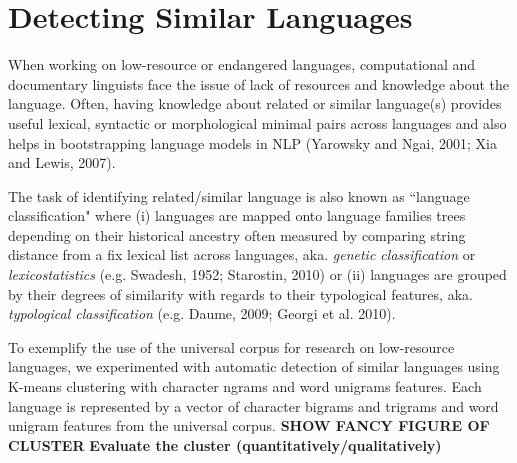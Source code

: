 \section{Detecting Similar Languages} \label{sec:cluster}

When working on low-resource or endangered languages, computational and documentary linguists face the issue of lack of resources and knowledge about the language. Often, having knowledge about related or similar language(s) provides useful lexical, syntactic or morphological minimal pairs across languages and also helps in bootstrapping language models in NLP (Yarowsky
and Ngai, 2001; Xia and Lewis, 2007). 

The task of identifying related/similar language is also known as ``language classification" where (i) languages are mapped onto language families trees depending on their historical ancestry often measured by comparing string distance from a fix lexical list across languages, aka. \emph{genetic classification} or \emph{lexicostatistics} (e.g. Swadesh, 1952; Starostin, 2010) or (ii) languages are grouped by their degrees of similarity with regards to their typological features, aka. \emph{typological classification} (e.g. Daume, 2009; Georgi et al. 2010).

To exemplify the use of the universal corpus for research on low-resource languages, we experimented with automatic detection of similar languages using K-means clustering with character ngrams and word unigrams features. Each language is represented by a vector of character bigrams and trigrams and word unigram features from the universal corpus. 
\newline \newline
\noindent \textbf{SHOW FANCY FIGURE OF CLUSTER}
\newline \newline
\textbf{Evaluate the cluster (quantitatively/qualitatively)}

